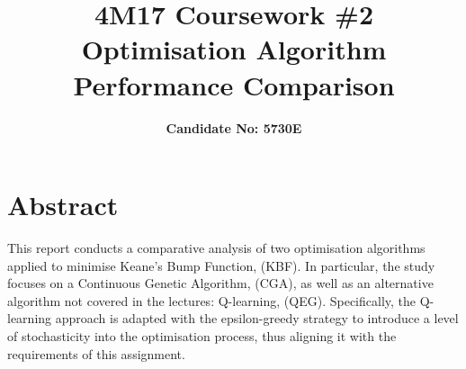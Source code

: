\documentclass[10pt]{article}
\title{\textbf{4M17 Coursework \#2 \\ Optimisation Algorithm Performance Comparison}}
\author{\textbf{Candidate No: 5730E}}
\begin{document}
\maketitle
\section{Abstract}
This report conducts a comparative analysis of two optimisation algorithms applied to minimise Keane's Bump Function, (KBF). In particular, the study focuses on a Continuous Genetic Algorithm, (CGA), as well as an alternative algorithm not covered in the lectures: Q-learning, (QEG). Specifically, the Q-learning approach is adapted with the epsilon-greedy strategy to introduce a level of stochasticity into the optimisation process, thus aligning it with the requirements of this assignment.
\end{document}
